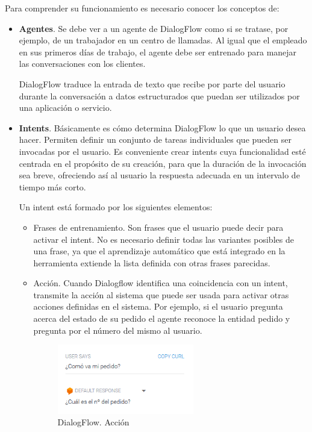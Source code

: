 Para comprender su funcionamiento es necesario conocer los conceptos de:
\begin{itemize}
     \item \textbf{Agentes}. Se debe ver a un agente de DialogFlow como si se tratase, por ejemplo, de un trabajador en un centro de llamadas. Al igual que el empleado en sus primeros días de trabajo, el agente debe ser entrenado para manejar las conversaciones con los clientes. 
     
     DialogFlow traduce la entrada de texto que recibe por parte del usuario durante la conversación a datos estructurados que puedan ser utilizados por una aplicación o servicio.
    
     \item \textbf{Intents}. Básicamente es cómo determina DialogFlow lo que un usuario desea hacer. Permiten definir un conjunto de tareas individuales que pueden ser invocadas por el usuario. Es conveniente crear intents cuya funcionalidad esté centrada en el propósito de su creación, para que la duración de la invocación sea breve, ofreciendo así al usuario la respuesta adecuada en un intervalo de tiempo más corto.
     
     Un intent está formado por los siguientes elementos:
     \begin{itemize}
         \item Frases de entrenamiento. Son frases que el usuario puede decir para activar el intent. No es necesario definir todas las variantes posibles de una frase, ya que el aprendizaje automático que está integrado en la herramienta extiende la lista definida con otras frases parecidas.
         \item Acción. Cuando Dialogflow identifica una coincidencia con un intent, transmite la acción al sistema que puede ser usada para activar otras acciones definidas en el sistema. Por ejemplo, si el usuario pregunta acerca del estado de su pedido el agente reconoce la entidad pedido y pregunta por el número del mismo al usuario.  
         
         \begin{figure}[ht]
             \begin{center}
                \includegraphics[width = 0.60\textwidth]{Figuras/Accion.PNG}
             \end{center}
             \caption{\label{fig:Accion}DialogFlow. Acción}
         \end{figure}
         

\end{itemize}
\end{itemize}
